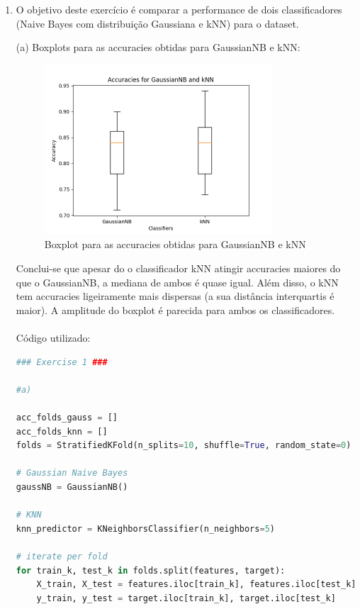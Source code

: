 \documentclass[a4paper,12pt]{article} %
\begin{document}
\begin{enumerate}
    \item O objetivo deste exercício é comparar a performance de dois classificadores
    (Naive Bayes com distribuição Gaussiana e kNN) para o dataset.
    
        (a) Boxplots para as accuracies obtidas para GaussianNB e kNN:
        \begin{figure}[H]
            \centering
            \includegraphics[width=0.8\textwidth]{ex1a_boxplot.png}
            \caption{Boxplot para as accuracies obtidas para GaussianNB e kNN}
            \label{fig:boxplot}
        \end{figure}
        Conclui-se que apesar do o classificador kNN atingir accuracies maiores do que 
        o GaussianNB, a mediana de ambos é quase igual. Além disso, o kNN tem accuracies ligeiramente mais dispersas 
        (a sua distância interquartis é maior). A amplitude do boxplot é parecida para ambos os classificadores. 
        \\ \\
        Código utilizado:
        \begin{lstlisting}[language=Python]
### Exercise 1 ###

#a)

acc_folds_gauss = []
acc_folds_knn = []
folds = StratifiedKFold(n_splits=10, shuffle=True, random_state=0)

# Gaussian Naive Bayes
gaussNB = GaussianNB()

# KNN
knn_predictor = KNeighborsClassifier(n_neighbors=5)

# iterate per fold
for train_k, test_k in folds.split(features, target):
    X_train, X_test = features.iloc[train_k], features.iloc[test_k]
    y_train, y_test = target.iloc[train_k], target.iloc[test_k]
    

\end{lstlisting}
\end{enumerate}
\end{document}
